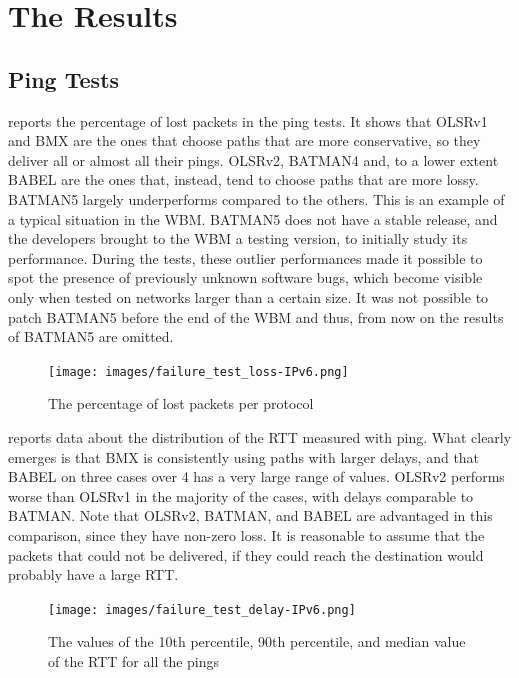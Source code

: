\documentclass[10pt,onecolumn]{paper}
\begin{document}
\section{The Results}

\subsection{Ping Tests}

 reports the percentage of lost packets in the ping tests. It
shows that OLSRv1 and BMX are the ones that choose paths that are more
conservative, so they deliver all or almost all their pings. OLSRv2, BATMAN4
and, to a lower extent BABEL are the ones that, instead, tend to choose paths
that are more lossy. BATMAN5 largely underperforms compared to the others. This
is an example of a typical situation in the WBM. BATMAN5 does not have a stable
release, and the developers brought to the WBM a testing version, to initially
study its performance. During the tests, these outlier performances made it
possible to spot the presence of previously unknown software bugs, which become
visible only when tested on networks larger than a certain size. 
It was not possible to patch BATMAN5 before the end of the WBM and thus, from
now on the results of BATMAN5 are omitted. 

\begin{figure}
  \centering
  \texttt{[image: images/failure\_test\_loss-IPv6.png]}
  \caption{The percentage of lost packets per protocol}
    \label{fig:pingloss}
\end{figure}

 reports data about the distribution of the RTT measured
with ping. What clearly emerges is that BMX is consistently using paths with
larger delays, and that BABEL on three cases over 4 has a very large range of
values. OLSRv2 performs worse than OLSRv1 in the majority of the cases, with
delays comparable to BATMAN. Note that OLSRv2, BATMAN, and BABEL are advantaged
in this comparison, since they have non-zero loss. It is reasonable to assume
that the packets that could not be delivered, if they could reach the
destination would probably have a large RTT.

\begin{figure}
  \centering
  \texttt{[image: images/failure\_test\_delay-IPv6.png]}
  \caption{The values of the 10th percentile, 90th percentile, and median value
    of the RTT for all the pings}
  \label{fig:delaydist}
\end{figure}
\end{document}
